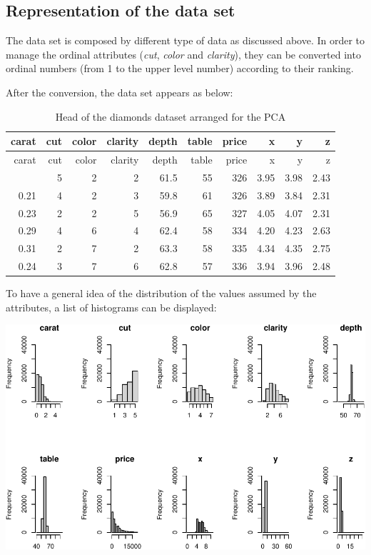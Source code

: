 \documentclass[
]{article}
\begin{document}
\hypertarget{representation-of-the-data-set}{%
\subsection{Representation of the data
set}\label{representation-of-the-data-set}}

The data set is composed by different type of data as discussed above.
In order to manage the ordinal attributes (\emph{cut}, \emph{color} and
\emph{clarity}), they can be converted into ordinal numbers (from 1 to
the upper level number) according to their ranking.

After the conversion, the data set appears as below:

\begin{longtable}[]{@{}rrrrrrrrrr@{}}
\caption{Head of the diamonds dataset arranged for the
PCA}\tabularnewline
\toprule\noalign{}
carat & cut & color & clarity & depth & table & price & x & y & z \\
\midrule\noalign{}
\endfirsthead
\toprule\noalign{}
carat & cut & color & clarity & depth & table & price & x & y & z \\
\midrule\noalign{}
\endhead
\bottomrule\noalign{}
\endlastfoot
0.23 & 5 & 2 & 2 & 61.5 & 55 & 326 & 3.95 & 3.98 & 2.43 \\
0.21 & 4 & 2 & 3 & 59.8 & 61 & 326 & 3.89 & 3.84 & 2.31 \\
0.23 & 2 & 2 & 5 & 56.9 & 65 & 327 & 4.05 & 4.07 & 2.31 \\
0.29 & 4 & 6 & 4 & 62.4 & 58 & 334 & 4.20 & 4.23 & 2.63 \\
0.31 & 2 & 7 & 2 & 63.3 & 58 & 335 & 4.34 & 4.35 & 2.75 \\
0.24 & 3 & 7 & 6 & 62.8 & 57 & 336 & 3.94 & 3.96 & 2.48 \\
\end{longtable}

To have a general idea of the distribution of the values assumed by the
attributes, a list of histograms can be displayed:

\includegraphics{Report_files/figure-latex/unnamed-chunk-4-1.pdf}
\end{document}
